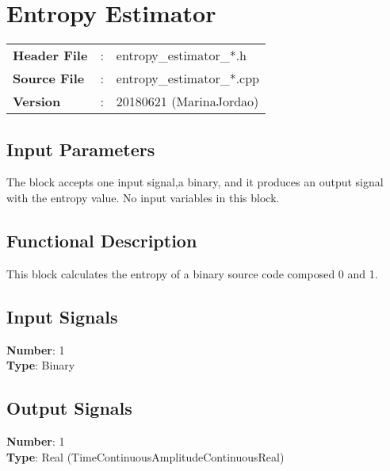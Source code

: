 \clearpage

\section{Entropy Estimator}

\begin{tcolorbox}	
\begin{tabular}{p{2.75cm} p{0.2cm} p{10.5cm}} 	
\textbf{Header File}   &:& entropy\_estimator\_*.h \\
\textbf{Source File}   &:& entropy\_estimator\_*.cpp \\
\textbf{Version}       &:& 20180621 (MarinaJordao)
\end{tabular}
\end{tcolorbox}

\subsection*{Input Parameters}

The block accepts one input signal,a binary, and it produces an output signal with the entropy value. 
No input variables in this block.


\subsection*{Functional Description}


This block calculates the entropy of a binary source code composed 0 and 1.
\subsection*{Input Signals}

\textbf{Number}: 1\\
\textbf{Type}: Binary 

\subsection*{Output Signals}

\textbf{Number}: 1\\
\textbf{Type}: Real (TimeContinuousAmplitudeContinuousReal)
%
